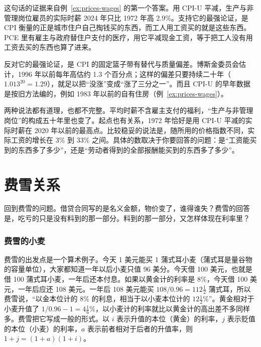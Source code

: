 \begin{pitfall}[美国普通工人的实际工资五十年没涨]
这句话的证据来自例~\ref{ex:prices-wages} 的第一个答案。用 CPI-U 平减，生产与非管理岗位雇员的实际时薪 2024 年只比 1972 年高 2.9\%。支持它的最强论证，是 CPI 衡量的正是城市住户自己掏钱买的东西，而工人用工资买的就是这些东西。PCE 里有雇主与政府替住户支付的医疗，用它平减现金工资，等于把工人没有用工资去买的东西也算了进来。

反对它的最强论证，是 CPI 的固定篮子带有替代与质量偏差。博斯金委员会估计，1996 年以前每年高估约 1.3 个百分点；这样的偏差只要持续二十年（$1.013^{20}=1.29$），就足以把“没涨”变成“涨了三分之一”。而且 CPI-U 的早年数据是按旧方法编的，例如 1983 年以前的自有住房（例~\ref{ex:prices-wages}）。

两种说法都有道理，也都不完整。平均时薪不含雇主支付的福利，“生产与非管理岗位”的构成五十年里也变了。起点也有关系，1972 年恰好是用 CPI-U 平减的实际时薪在 2020 年以前的最高点。比较稳妥的说法是，随所用的价格指数不同，实际工资的增长在 3\% 到 33\% 之间。具体的数取决于你要回答的问题：是“工资能买到的东西多了多少”，还是“劳动者得到的全部报酬能买到的东西多了多少”。
\end{pitfall}

\section{费雪关系}\label{sec:prices-fisher}

回到费雪的问题。借贷合同写的是名义金额，物价变了，谁得谁失？费雪的回答是，吃亏的只是没有料到的那一部分。料到的那一部分，又怎样体现在利率里？

\subsubsection{费雪的小麦}
费雪的出发点是一个算术例子。今天 1 美元能买 1 蒲式耳小麦（蒲式耳是量谷物的容量单位），大家都知道一年以后小麦只值 96 美分。今天借 100 美元，也就是借 100 蒲式耳小麦，一年后还本付息。如果以黄金计的利率是 8\%，今天借 100 美元，一年后应还 108 美元。一年后 108 美元能买 $108/0.96=112\tfrac12$ 蒲式耳，所以费雪说，“以金本位计的 8\% 的利息，相当于以小麦本位计的 $12\tfrac12\%$”\cite{fisher1896}。黄金相对于小麦升值了 $1/0.96-1=4\tfrac16\%$，以小麦计的利率就比以黄金计的高出差不多同样多。费雪把它写成一般的形式。以 $i$ 表示升值的本位（黄金）的利率，$j$ 表示贬值的本位（小麦）的利率，$a$ 表示前者相对于后者的升值率，则 $1+j=(1+a)(1+i)$\cite{fisher1896}。


